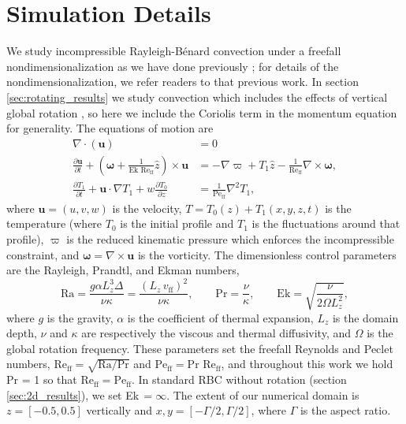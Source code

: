 \documentclass[aps, pre, onecolumn, nofootinbib, notitlepage, groupedaddress, amsfonts, amssymb, amsmath, longbibliography, superscriptaddress]{revtex4-1}
\newcommand{\Div}[1]{\ensuremath{\nabla\cdot\left( #1\right)}}
\newcommand{\grad}{\ensuremath{\nabla}}
\newcommand{\RB}{Rayleigh-B\'{e}nard }
\newcommand{\Reff}{\ensuremath{\text{Re}_{\text{ff}}}}
\newcommand{\Peff}{\ensuremath{\text{Pe}_{\text{ff}}}}
\begin{document}
\section{Simulation Details}
\label{sec:simulations}
We study incompressible \RB convection under a freefall nondimensionalization as we have done previously \cite{anders&all2018}; for details of the nondimensionalization, we refer readers to that previous work.
In section \ref{sec:rotating_results} we study convection which includes the effects of vertical global rotation \cite{julien&all1996}, so here we include the Coriolis term in the momentum equation for generality.
The equations of motion are
\begin{align}
\Div{\bm{u}} &= 0
	\label{eqn:incompressible}
\\
\frac{\partial \bm{u}}{\partial t} + \left(\bm{\omega} + \frac{1}{\text{Ek }\Reff}\hat{z}\right)\times\bm{u} 
&= - \grad \varpi + T_1\hat{z} - \frac{1}{\Reff}\grad\times\bm{\omega},
	\label{eqn:bouss_momentum}
\\
\frac{\partial T_1}{\partial t}  + \bm{u}\cdot\grad T_1 + w \frac{\partial T_0}{\partial z} 
&= \frac{1}{\Peff}\grad^2 T_1,
	\label{eqn:bouss_energy}
\end{align}
where $\bm{u} = (u, v, w)$ is the velocity, $T = T_0(z) + T_1(x, y, z, t)$ is the temperature (where $T_0$ is the initial profile and $T_1$ is the fluctuations around that profile), $\varpi$ is the reduced kinematic pressure \cite{anders&all2018} which enforces the incompressible constraint, and $\bm{\omega} = \grad \times \bm{u}$ is the vorticity.
The dimensionless control parameters are the Rayleigh, Prandtl, and Ekman numbers,
\begin{equation}
\text{Ra} = \frac{g \alpha L_z^3 \Delta}{\nu\kappa} = \frac{(L_z\,v_{\text{ff}})^2}{\nu\kappa}, \qquad \text{Pr} = \frac{\nu}{\kappa}, \qquad \text{Ek} = \sqrt{\frac{\nu}{2\Omega L_z^2}},
\end{equation}
where $g$ is the gravity, $\alpha$ is the coefficient of thermal expansion, $L_z$ is the domain depth, $\nu$ and $\kappa$ are respectively the viscous and thermal diffusivity, and $\Omega$ is the global rotation frequency.
These parameters set the freefall Reynolds and Peclet numbers, $\Reff = \sqrt{\text{Ra}/\text{Pr}}$ and $\Peff = \text{Pr }\Reff$, and throughout this work we hold Pr = 1 so that $\Reff = \Peff$.
In standard RBC without rotation (section \ref{sec:2d_results}), we set Ek$\,= \infty$.
The extent of our numerical domain is $z = [-0.5, 0.5]$ vertically and $x, y = [-\Gamma/2, \Gamma/2]$, where $\Gamma$ is the aspect ratio.
\end{document}
